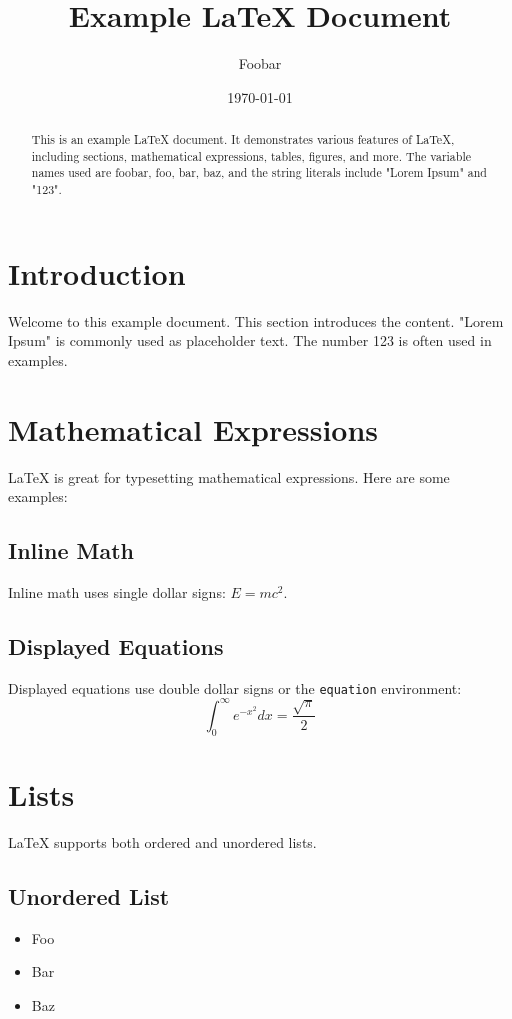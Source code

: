 \documentclass{article}
\title{Example LaTeX Document}
\author{Foobar}
\date{\today}
\begin{document}
\maketitle

\begin{abstract}
This is an example LaTeX document. It demonstrates various features of LaTeX, including sections, mathematical expressions, tables, figures, and more. The variable names used are foobar, foo, bar, baz, and the string literals include "Lorem Ipsum" and "123".
\end{abstract}

\section{Introduction}
Welcome to this example document. This section introduces the content. "Lorem Ipsum" is commonly used as placeholder text. The number 123 is often used in examples.

\section{Mathematical Expressions}
LaTeX is great for typesetting mathematical expressions. Here are some examples:

\subsection{Inline Math}
Inline math uses single dollar signs: $E = mc^2$.

\subsection{Displayed Equations}
Displayed equations use double dollar signs or the \texttt{equation} environment:
\begin{equation}
\int_0^\infty e^{-x^2} dx = \frac{\sqrt{\pi}}{2}
\end{equation}

\section{Lists}
LaTeX supports both ordered and unordered lists.

\subsection{Unordered List}
\begin{itemize}
    \item Foo
    \item Bar
    \item Baz
\end{itemize}
\end{document}
